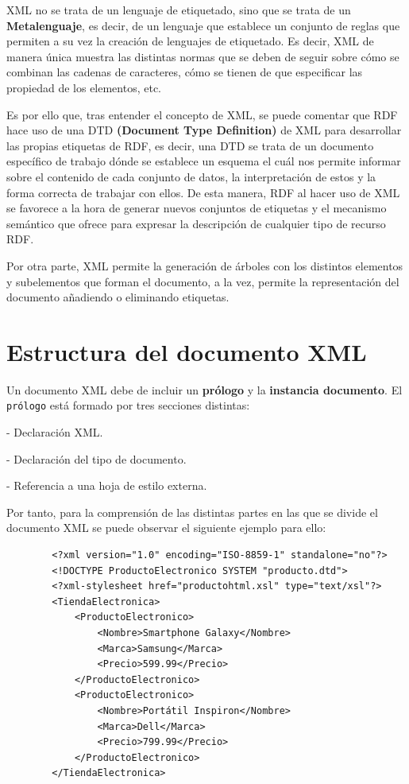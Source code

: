 \documentclass[11pt]{report}
\begin{document}
XML no se trata de un lenguaje de etiquetado, sino que se trata de un \textbf{Metalenguaje}, es decir, de un lenguaje que establece un conjunto de reglas que permiten a su vez la creación de lenguajes de etiquetado. Es decir, XML de manera única muestra las distintas normas que se deben de seguir sobre cómo se combinan las cadenas de caracteres, cómo se tienen de que especificar las propiedad de los elementos, etc.

Es por ello que, tras entender el concepto de XML, se puede comentar que RDF hace uso de una DTD \textbf{(Document Type Definition)} de XML para desarrollar las propias etiquetas de RDF, es decir, una DTD se trata de un documento específico de trabajo dónde se establece un esquema el cuál nos permite informar sobre el contenido de cada conjunto de datos, la interpretación de estos y la forma correcta de trabajar con ellos. De esta manera, RDF al hacer uso de XML se favorece a la hora de generar nuevos conjuntos de etiquetas y el mecanismo semántico que ofrece para expresar la descripción de cualquier tipo de recurso RDF.

Por otra parte, XML permite la generación de árboles con los distintos elementos y subelementos que forman el documento, a la vez, permite la representación del documento añadiendo o eliminando etiquetas.

\section{Estructura del documento XML}

Un documento XML debe de incluir un \textbf{prólogo} y la \textbf{instancia documento}. El \texttt{prólogo} está formado por tres secciones distintas:

- Declaración XML.

- Declaración del tipo de documento.

- Referencia a una hoja de estilo externa.

Por tanto, para la comprensión de las distintas partes en las que se divide el documento XML se puede observar el siguiente ejemplo para ello:

\begin{verbatim}
		<?xml version="1.0" encoding="ISO-8859-1" standalone="no"?>
		<!DOCTYPE ProductoElectronico SYSTEM "producto.dtd">
		<?xml-stylesheet href="productohtml.xsl" type="text/xsl"?>
		<TiendaElectronica>
			<ProductoElectronico>
				<Nombre>Smartphone Galaxy</Nombre>
				<Marca>Samsung</Marca>
				<Precio>599.99</Precio>
			</ProductoElectronico>
			<ProductoElectronico>
				<Nombre>Portátil Inspiron</Nombre>
				<Marca>Dell</Marca>
				<Precio>799.99</Precio>
			</ProductoElectronico>
		</TiendaElectronica>
	\end{verbatim}
\end{document}

